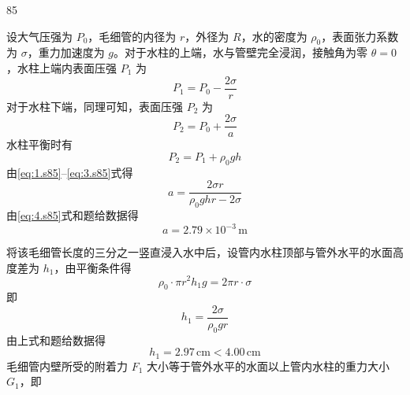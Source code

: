 \begin{solution}{85}
    \begin{subsolution}
        \begin{subsubsolution}
            设大气压强为 $P_{0}$，毛细管的内径为 $r$，外径为 $R$，水的密度为 $\rho_{0}$，表面张力系数为 $\sigma$，重力加速度为 $g$。对于水柱的上端，水与管壁完全浸润，接触角为零 $\theta=0$，水柱上端内表面压强 $P_{1}$ 为
            \begin{equation}
                P_{1} = P_{0} - \frac{2\sigma}{r}
                \label{eq:1.s85}
            \end{equation}
            对于水柱下端，同理可知，表面压强 $P_{2}$ 为
            \begin{equation}
                P_{2} = P_{0} + \frac{2\sigma}{a}
                \label{eq:2.s85}
            \end{equation}
            水柱平衡时有
            \begin{equation}
                P_{2} = P_{1} + \rho_{0} g h
                \label{eq:3.s85}
            \end{equation}
            由\eqref{eq:1.s85}--\eqref{eq:3.s85}式得
            \begin{equation}
                a = \frac{2\sigma r}{\rho_{0} g h r - 2\sigma}
                \label{eq:4.s85}
            \end{equation}
            由\eqref{eq:4.s85}式和题给数据得
            \begin{equation}
                a = 2.79 \times 10^{-3}\,\mathrm{m}
                \label{eq:5.s85}
            \end{equation}
        \end{subsubsolution}
        \begin{subsubsolution}
            将该毛细管长度的三分之一竖直浸入水中后，设管内水柱顶部与管外水平的水面高度差为 $h_{1}$，由平衡条件得
            \begin{equation}
                \rho_{0} \cdot \pi r^{2} h_{1} g = 2\pi r \cdot \sigma
                \label{eq:6.s85}
            \end{equation}
            即
            \[
                h_{1} = \frac{2\sigma}{\rho_{0} g r}
            \]
            由上式和题给数据得
            \begin{equation}
                h_{1} = 2.97\,\mathrm{cm} < 4.00\,\mathrm{cm}
                \label{eq:7.s85}
            \end{equation}
            毛细管内壁所受的附着力 $F_{1}$ 大小等于管外水平的水面以上管内水柱的重力大小 $G_{1}$，即

\end{subsubsolution}
\end{subsolution}
\end{solution}
